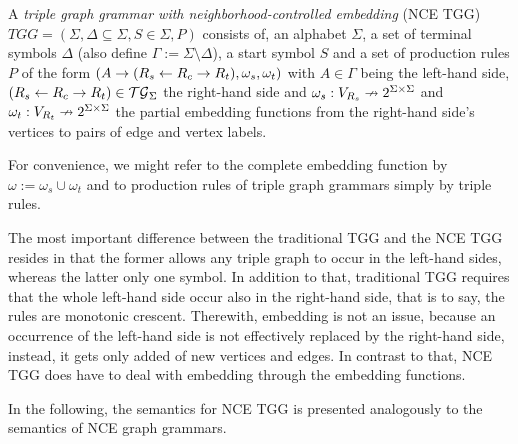 \begin{definition}
	\label{def:tgg}
	A \emph{triple graph grammar with neighborhood-controlled embedding} (NCE TGG) $TGG = (\Sigma, \Delta \subseteq \Sigma, S \in \Sigma, P)$ consists of, an alphabet $\Sigma$, a set of terminal symbols $\Delta$ (also define $\Gamma := \Sigma \setminus \Delta$), a start symbol $S$ and a set of production rules $P$ of the form $(A \to (R_s \overset{}{\leftarrow} R_c \overset{}{\rightarrow} R_t), \omega_s, \omega_t)$ with $A \in \Gamma$ being the left-hand side, $(R_s \overset{}{\leftarrow} R_c \overset{}{\rightarrow} R_t) \in \mathcal{TG}_{\Sigma}$ the right-hand side and $\omega_s : V_{R_s} \nrightarrow 2^{\Sigma \times \Sigma}$ and $\omega_t : V_{R_t} \nrightarrow 2^{\Sigma \times \Sigma}$ the partial embedding functions from the right-hand side's vertices to pairs of edge and vertex labels.
\end{definition}

For convenience, we might refer to the complete embedding function by $\omega:= \omega_s \cup \omega_t$ and to production rules of triple graph grammars simply by triple rules.

The most important difference between the traditional TGG and the NCE TGG resides in that the former allows any triple graph to occur in the left-hand sides, whereas the latter only one symbol. In addition to that, traditional TGG requires that the whole left-hand side occur also in the right-hand side, that is to say, the rules are monotonic crescent. Therewith, embedding is not an issue, because an occurrence of the left-hand side is not effectively replaced by the right-hand side, instead, it gets only added of new vertices and edges. In contrast to that, NCE TGG does have to deal with embedding through the embedding functions.

In the following, the semantics for NCE TGG is presented analogously to the semantics of NCE graph grammars.

